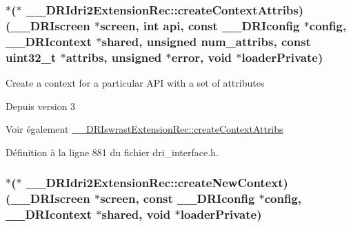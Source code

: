 \hypertarget{struct_____d_r_idri2_extension_rec_a40cbd226d9bc5c4fcf380c751c449890}{
\subsubsection[{create\-Context\-Attribs}]{$\ast$($\ast$ \-\_\-\-\_\-\-D\-R\-Idri2\-Extension\-Rec\-::create\-Context\-Attribs)({\bf \-\_\-\-\_\-\-D\-R\-Iscreen} $\ast$screen, int api, const {\bf \-\_\-\-\_\-\-D\-R\-Iconfig} $\ast$config, {\bf \-\_\-\-\_\-\-D\-R\-Icontext} $\ast$shared, unsigned num\-\_\-attribs, const uint32\-\_\-t $\ast${\bf attribs}, unsigned $\ast$error, {\bf void} $\ast$loader\-Private)}}\label{struct_____d_r_idri2_extension_rec_a40cbd226d9bc5c4fcf380c751c449890}
Create a context for a particular A\-P\-I with a set of attributes

\begin{DoxySince}{Depuis}
version 3
\end{DoxySince}
\begin{DoxySeeAlso}{Voir également}
\hyperlink{struct_____d_r_iswrast_extension_rec_a7c9ee2aa3822403e5944b0ae3222e621}{\-\_\-\-\_\-\-D\-R\-Iswrast\-Extension\-Rec\-::create\-Context\-Attribs} 
\end{DoxySeeAlso}


Définition à la ligne 881 du fichier dri\-\_\-interface.\-h.

\hypertarget{struct_____d_r_idri2_extension_rec_a1c53d4e7d5aa4e7e757173bf52494878}{
\subsubsection[{create\-New\-Context}]{$\ast$($\ast$ \-\_\-\-\_\-\-D\-R\-Idri2\-Extension\-Rec\-::create\-New\-Context)({\bf \-\_\-\-\_\-\-D\-R\-Iscreen} $\ast$screen, const {\bf \-\_\-\-\_\-\-D\-R\-Iconfig} $\ast$config, {\bf \-\_\-\-\_\-\-D\-R\-Icontext} $\ast$shared, {\bf void} $\ast$loader\-Private)}}\label{struct_____d_r_idri2_extension_rec_a1c53d4e7d5aa4e7e757173bf52494878}


